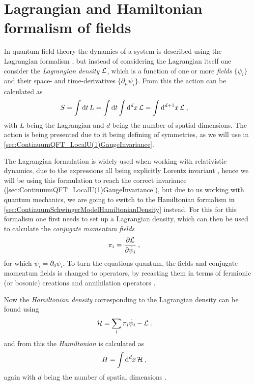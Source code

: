 \documentclass[../main.tex]{subfiles} %
\begin{document}
\section{Lagrangian and Hamiltonian formalism of fields} \label{sec:LagrangianAndHamiltonianFormalismOfFields}

In quantum field theory the dynamics of a system is described using the Lagrangian formalism \cite{peskin_introToQFT_1995,Clark_LagrangianQFT_1988}, but instead of considering the Lagrangian itself one consider the \emph{Lagrangian density} $\mathcal{L}$, which is a function of one or more \emph{fields} $\{\psi_i\}$ and their space- and time-derivatives $\{\partial_\mu \psi_i\}$. From this the action can be calculated as
\begin{align}
    S &= \int \dd{t} L = \int \dd{t} \int \dd[d]{x} \mathcal{L} = \int \dd[d+1]{x} \mathcal{L} \: ,
\end{align}
with $L$ being the Lagrangian and $d$ being the number of spatial dimensions. The action is being presented due to it being defining of symmetries, as we will use in \cref{sec:ContinuumQFT_LocalU(1)GaugeInvariance}.

The Lagrangian formulation is widely used when working with relativistic dynamics, due to the expressions all being explicitly Lorentz invariant \cite{peskin_introToQFT_1995}, hence we will be using this formulation to reach the correct invariance (\cref{sec:ContinuumQFT_LocalU(1)GaugeInvariance}), but due to us working with quantum mechanics, we are going to switch to the Hamiltonian formalism in \cref{sec:ContinuumSchwingerModelHamiltonianDensity} instead. For this for this formalism one first needs to set up a Lagrangian density, which can then be used to calculate the \emph{conjugate momentum fields} \cite{peskin_introToQFT_1995,Clark_LagrangianQFT_1988}
\begin{align} \label{eq:LagrangianFormalism_ConjugateMomentumField}
    \pi_i &= \pdv{\mathcal{L}}{\dot{\psi}_i} \: ,
\end{align}
for which $\dot{\psi}_i = \partial_0\psi_i$. To turn the equations quantum, the fields and conjugate momentum fields is changed to operators, by recasting them in terms of fermionic (or bosonic) creations and annihilation operators \cite{panyella_masterThesis_2019}.

Now the \emph{Hamiltonian density} corresponding to the Lagrangian density can be found using
\begin{align} \label{eq:LagrangianFormalism_HamiltonianDensity}
    \mathcal{H} &= \sum_i \pi_i \dot{\psi}_i - \mathcal{L} \: ,
\end{align}
and from this the \emph{Hamiltonian} is calculated as
\begin{align} \label{eq:LagrangianFormalism_Hamiltonian}
    H &= \int \dd[d]{x} \mathcal{H} \: ,
\end{align}
again with $d$ being the number of spatial dimensions \cite{Clark_LagrangianQFT_1988}.
\end{document}
